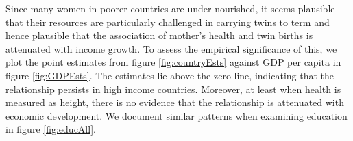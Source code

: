 \documentclass{nature}
\begin{document}
\begin{linenumbers}
Since many women in poorer countries are under-nourished, it seems plausible that their resources are particularly challenged in carrying twins to term and hence plausible that the association of mother's health and twin births is attenuated with income growth. To assess the empirical significance of this, we plot the point estimates from figure \ref{fig:countryEsts} against GDP per capita in figure \ref{fig:GDPEsts}. The estimates lie above the zero line, indicating that the relationship persists in high income countries. Moreover, at least when health is measured as height, there is no evidence that the relationship is attenuated with economic development. %
We document similar patterns when examining education in figure \ref{fig:educAll}. 



\end{linenumbers}
\end{document}
